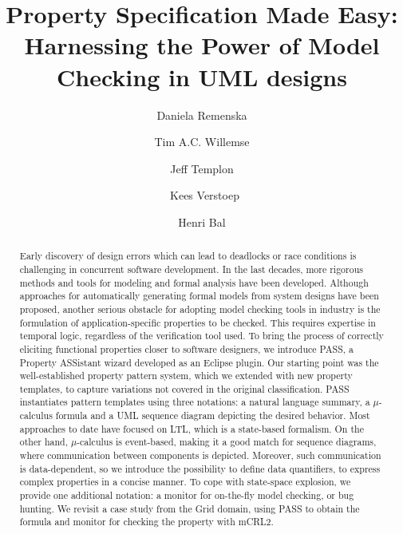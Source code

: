 \documentclass[letter]{llncs}
\begin{document}
\title{Property Specification Made Easy: Harnessing the Power of Model Checking in UML designs}

\author{Daniela Remenska
\and Tim A.C. Willemse \and Jeff Templon \and\
Kees Verstoep \and Henri Bal}
%


\maketitle

\begin{abstract}
Early discovery of design errors which can lead to deadlocks or race conditions is 
challenging in concurrent software development. 
In the last decades, more rigorous
methods and tools for modeling and formal analysis have been developed. 
Although approaches for automatically generating formal models from system designs have 
been proposed, another serious obstacle for adopting model checking tools in industry
is the formulation of application-specific properties to be checked. 
This requires expertise in temporal logic, regardless of the verification tool used.
To bring the process of correctly eliciting functional properties closer to software 
designers, we introduce PASS, a Property ASSistant wizard developed 
as an Eclipse plugin. Our starting point was the well-established property pattern system,
which we extended with new property templates, to capture variations not covered 
in the original classification. PASS instantiates pattern templates using three notations: a natural language summary, a $\mu$-calculus formula
and a UML sequence diagram depicting the desired behavior. Most approaches to date 
have focused on LTL, which is a state-based formalism. On the other hand,
 $\mu$-calculus is event-based, making it a good match for sequence diagrams, where communication between
 components is depicted. 
Moreover, such communication is data-dependent, so we introduce
the possibility to define data quantifiers, to express complex properties in a concise manner.
To cope with state-space explosion, we provide one additional notation: a monitor for on-the-fly model checking, or bug hunting.
We revisit a case study from the Grid domain, using PASS to obtain the
formula and monitor for checking the property with mCRL2.
\end{abstract}
\end{document}
